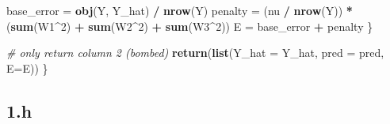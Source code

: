 \documentclass[12pt,halfline,a4paper,]{ouparticle}
\newenvironment{Shaded}{\begin{snugshade}}{\end{snugshade}}
\newcommand{\AttributeTok}[1]{\textcolor[rgb]{0.13,0.29,0.53}{#1}}
\newcommand{\CommentTok}[1]{\textcolor[rgb]{0.56,0.35,0.01}{\textit{#1}}}
\newcommand{\DecValTok}[1]{\textcolor[rgb]{0.00,0.00,0.81}{#1}}
\newcommand{\FunctionTok}[1]{\textcolor[rgb]{0.13,0.29,0.53}{\textbf{#1}}}
\newcommand{\NormalTok}[1]{#1}
\newcommand{\OtherTok}[1]{\textcolor[rgb]{0.56,0.35,0.01}{#1}}
\newcommand{\SpecialCharTok}[1]{\textcolor[rgb]{0.81,0.36,0.00}{\textbf{#1}}}
\begin{document}
\begin{Shaded}
\begin{Highlighting}[]
\NormalTok{    base\_error }\OtherTok{=} \FunctionTok{obj}\NormalTok{(Y, Y\_hat) }\SpecialCharTok{/} \FunctionTok{nrow}\NormalTok{(Y)}
\NormalTok{    penalty }\OtherTok{=}\NormalTok{ (nu }\SpecialCharTok{/} \FunctionTok{nrow}\NormalTok{(Y)) }\SpecialCharTok{*}\NormalTok{ (}\FunctionTok{sum}\NormalTok{(W1}\SpecialCharTok{\^{}}\DecValTok{2}\NormalTok{) }\SpecialCharTok{+} \FunctionTok{sum}\NormalTok{(W2}\SpecialCharTok{\^{}}\DecValTok{2}\NormalTok{) }\SpecialCharTok{+} \FunctionTok{sum}\NormalTok{(W3}\SpecialCharTok{\^{}}\DecValTok{2}\NormalTok{))}
\NormalTok{    E }\OtherTok{=}\NormalTok{ base\_error }\SpecialCharTok{+}\NormalTok{ penalty}
\NormalTok{  \}}
  
  \CommentTok{\# only return column 2 (bombed)}
  \FunctionTok{return}\NormalTok{(}\FunctionTok{list}\NormalTok{(}\AttributeTok{Y\_hat =}\NormalTok{ Y\_hat, }\AttributeTok{pred =}\NormalTok{ pred, }\AttributeTok{E=}\NormalTok{E))}
\NormalTok{\}}
\end{Highlighting}
\end{Shaded}

\subsection*{1.h}\label{h}
\end{document}
